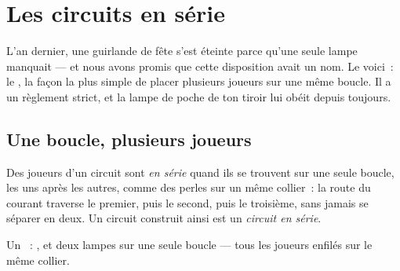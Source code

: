 \chapter{Les circuits en série}\label{ch:g4:series-circuits}

L'an dernier, une guirlande de fête s'est éteinte parce qu'une seule
lampe manquait --- et nous avons promis que cette disposition avait
un nom. Le voici~: le , la façon la plus simple de
placer plusieurs joueurs sur une même boucle. Il a un règlement
strict, et la lampe de poche de ton tiroir lui obéit depuis toujours.

\section{Une boucle, plusieurs joueurs}

\begin{definition}[En série]\label{def:g4:series-circuits:series}
Des joueurs d'un circuit sont \emph{en série}
quand ils se trouvent sur une seule boucle, les uns après les autres,
comme des perles sur un même collier~: la route du courant traverse
le premier, puis le second, puis le troisième, sans jamais se
séparer en deux. Un circuit construit ainsi est un \emph{circuit en
série}.
\end{definition}

\begin{omfigure}

{\small Un ~: ,  et deux lampes sur
une seule boucle --- tous les joueurs enfilés sur le même collier.}
\end{omfigure}

